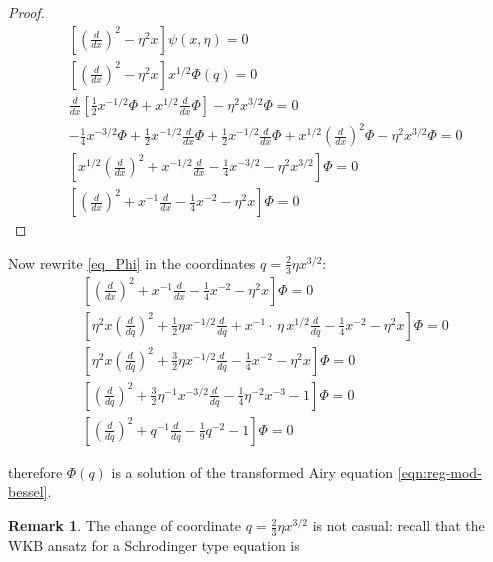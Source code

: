 \documentclass{article}
\theoremstyle{definition}
\newtheorem{remark}[definition]{Remark}
\theoremstyle{plain}
\begin{document}
{\begin{proof}
\begin{align*}
&\left[\left(\frac{d}{dx}\right)^2 - \eta^2 x \right] \psi(x, \eta) = 0\\
&\left[\left(\frac{d}{dx}\right)^2 - \eta^2 x \right] x^{1/2}\Phi(q) = 0\\
&\frac{d}{dx}\left[\frac{1}{2}x^{-1/2}\Phi+x^{1/2}\frac{d}{dx}\Phi\right]-\eta^2x^{3/2}\Phi=0\\
&-\frac{1}{4}x^{-3/2}\Phi+\frac{1}{2}x^{-1/2}\frac{d}{dx}\Phi+\frac{1}{2}x^{-1/2}\frac{d}{dx}\Phi+x^{1/2}\left(\frac{d}{dx}\right)^2\Phi-\eta^2x^{3/2}\Phi=0\\
&\left[x^{1/2}\left(\frac{d}{dx}\right)^2+x^{-1/2}\frac{d}{dx}-\frac{1}{4}x^{-3/2}-\eta^2x^{3/2}\right]\Phi=0\\
&\left[\left(\frac{d}{dx}\right)^2+x^{-1}\frac{d}{dx}-\frac{1}{4}x^{-2}-\eta^2x\right]\Phi=0
\end{align*}
\end{proof}
Now rewrite \eqref{eq_Phi} in the coordinates $q=\frac{2}{3}\eta x^{3/2}$: 
\begin{align*}
&\left[\left(\frac{d}{dx}\right)^2+x^{-1}\frac{d}{dx}-\frac{1}{4}x^{-2}-\eta^2x\right]\Phi=0\\
&\left[\eta^2x\left(\frac{d}{dq}\right)^2+\frac{1}{2}\eta x^{-1/2}\frac{d}{dq}+x^{-1}\cdot\, \eta\,  x^{1/2}\frac{d}{dq}-\frac{1}{4}x^{-2}-\eta^2x\right]\Phi=0\\
&\left[\eta^2x\left(\frac{d}{dq}\right)^2+\frac{3}{2}\eta x^{-1/2}\frac{d}{dq}-\frac{1}{4}x^{-2}-\eta^2x\right]\Phi=0\\
&\left[\left(\frac{d}{dq}\right)^2+\frac{3}{2}\eta^{-1} x^{-3/2}\frac{d}{dq}-\frac{1}{4}\eta^{-2}x^{-3}-1\right]\Phi=0\\
&\left[\left(\frac{d}{dq}\right)^2+q^{-1}\frac{d}{dq}-\frac{1}{9}q^{-2}-1\right]\Phi=0
\end{align*}

therefore $\Phi(q)$ is a solution of the transformed Airy equation \eqref{eqn:reg-mod-bessel}. 

\begin{remark}
The change of coordinate $q=\frac{2}{3}\eta x^{3/2}$ is not casual: recall that the WKB ansatz for a Schrodinger type equation is


\end{remark}}
\end{document}
